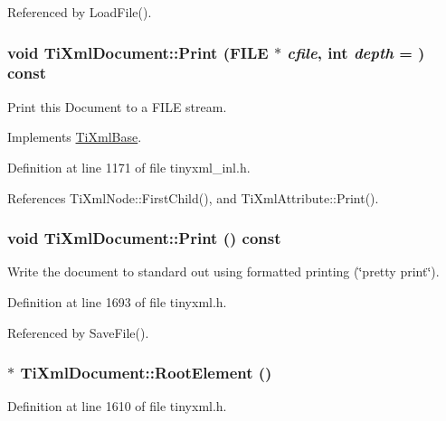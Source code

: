 Referenced by LoadFile().\hypertarget{class_ti_xml_document_a7b1aea204fee266b70b9c105c8bf2ada}{
\subsubsection[{Print}]{\setlength{\rightskip}{0pt plus 5cm}void TiXmlDocument::Print (FILE $\ast$ {\em cfile}, \/  int {\em depth} = {}) const}}
\label{class_ti_xml_document_a7b1aea204fee266b70b9c105c8bf2ada}


Print this Document to a FILE stream. 

Implements \hyperlink{class_ti_xml_base_a0de56b3f2ef14c65091a3b916437b512}{TiXmlBase}.

Definition at line 1171 of file tinyxml\_\-inl.h.

References TiXmlNode::FirstChild(), and TiXmlAttribute::Print().\hypertarget{class_ti_xml_document_af08389ec70ee9b2de7f800e206a18510}{
\subsubsection[{Print}]{\setlength{\rightskip}{0pt plus 5cm}void TiXmlDocument::Print () const}}
\label{class_ti_xml_document_af08389ec70ee9b2de7f800e206a18510}
Write the document to standard out using formatted printing (\char`\"{}pretty print\char`\"{}). 

Definition at line 1693 of file tinyxml.h.

Referenced by SaveFile().\hypertarget{class_ti_xml_document_a0b43e762a23f938b06651bc90b8a1013}{
\subsubsection[{RootElement}]{$\ast$ TiXmlDocument::RootElement ()}}
\label{class_ti_xml_document_a0b43e762a23f938b06651bc90b8a1013}


Definition at line 1610 of file tinyxml.h.

